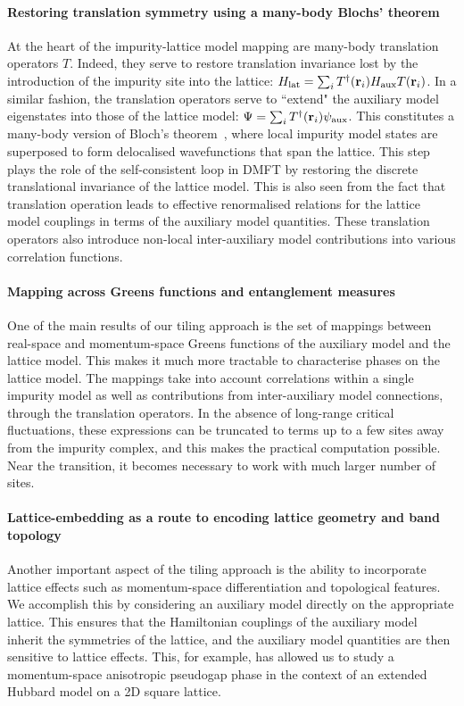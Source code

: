 \paragraph{Restoring translation symmetry using a many-body Blochs' theorem}
At the heart of the impurity-lattice model mapping are many-body translation operators \(T\). Indeed, they serve to restore translation invariance lost by the introduction of the impurity site into the lattice: \(H_\text{lat} = \sum_i T^\dagger({\bf r}_i) H_\text{aux} T({\bf r}_i)\). In a similar fashion, the translation operators serve to ``extend" the auxiliary model eigenstates into those of the lattice model: \(\Psi = \sum_i T^\dagger({\bf r}_i) \psi_\text{aux}\). This constitutes a many-body version of Bloch's theorem~\cite{Calais_1995,stoyanova}, where local impurity model states are superposed to form delocalised wavefunctions that span the lattice. This step plays the role of the self-consistent loop in DMFT by restoring the discrete translational invariance of the lattice model. This is also seen from the fact that translation operation leads to effective renormalised relations for the lattice model couplings in terms of the auxiliary model quantities. These translation operators also introduce non-local inter-auxiliary model contributions into various correlation functions.

\paragraph{Mapping across Greens functions and entanglement measures}
One of the main results of our tiling approach is the set of mappings between real-space and momentum-space Greens functions of the auxiliary model and the lattice model. This makes it much more tractable to characterise phases on the lattice model. The mappings take into account correlations within a single impurity model as well as contributions from inter-auxiliary model connections, through the translation operators. In the absence of long-range critical fluctuations, these expressions can be truncated to terms up to a few sites away from the impurity complex, and this makes the practical computation possible. Near the transition, it becomes necessary to work with much larger number of sites. 

\paragraph{Lattice-embedding as a route to encoding lattice geometry and band topology}
Another important aspect of the tiling approach is the ability to incorporate lattice effects such as momentum-space differentiation and topological features. We accomplish this by considering an auxiliary model directly on the appropriate lattice. This ensures that the Hamiltonian couplings of the auxiliary model inherit the  symmetries of the lattice, and the auxiliary model quantities are then sensitive to lattice effects. This, for example, has allowed us to study a momentum-space anisotropic pseudogap phase in the context of an extended Hubbard model on a 2D square lattice. 


